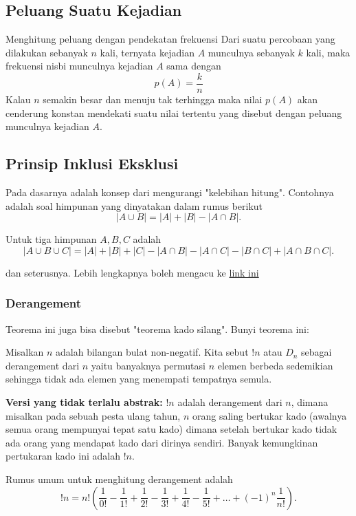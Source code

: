 \documentclass[11pt]{scrartcl}
\begin{document}
\subsection{Peluang Suatu Kejadian}
Menghitung peluang dengan pendekatan frekuensi 
Dari suatu percobaan yang dilakukan sebanyak $n$ kali, ternyata kejadian $A$ munculnya sebanyak 
$k$ kali, maka frekuensi nisbi munculnya kejadian $A$ sama dengan 
$$p(A)=\dfrac{k}{n}$$
Kalau $n$ semakin besar dan menuju tak terhingga maka nilai $p(A)$ akan cenderung konstan 
mendekati suatu nilai tertentu yang disebut dengan peluang munculnya kejadian $A$.

    \subsection{Prinsip Inklusi Eksklusi}
    Pada dasarnya adalah konsep dari mengurangi "kelebihan hitung". Contohnya adalah soal himpunan yang dinyatakan dalam rumus berikut
    $$|A \cup B|=|A|+|B|-|A \cap B|.$$
    
    Untuk tiga himpunan $A,B,C$ adalah
    $$|A \cup B \cup C|=|A|+|B|+|C|-|A \cap B|-|A \cap C|-|B \cap C|+|A \cap B \cap C|.$$
    
    dan seterusnya. Lebih lengkapnya boleh mengacu ke \href{https://brilliant.org/wiki/principle-of-inclusion-and-exclusion-pie/}{link ini}
    
    \subsubsection{Derangement}
    Teorema ini juga bisa disebut "teorema kado silang". Bunyi teorema ini:
    
    Misalkan $n$ adalah bilangan bulat non-negatif. Kita sebut $!n$ atau $D_n$ sebagai derangement dari $n$ yaitu banyaknya permutasi $n$ elemen berbeda sedemikian sehingga tidak ada elemen yang menempati tempatnya semula.
    
    \textbf{Versi yang tidak terlalu abstrak:} $!n$ adalah derangement dari $n$, dimana misalkan pada sebuah pesta ulang tahun, $n$ orang saling bertukar kado (awalnya semua orang mempunyai tepat satu kado) dimana setelah bertukar kado tidak ada orang yang mendapat kado dari dirinya sendiri. Banyak kemungkinan pertukaran kado ini adalah $!n$.
    
    Rumus umum untuk menghitung derangement adalah
    $$!n = n! \left(\dfrac{1}{0!}-\dfrac{1}{1!}+\dfrac{1}{2!}-\dfrac{1}{3!}+\dfrac{1}{4!}-\dfrac{1}{5!}+\dots+(-1)^n\dfrac{1}{n!}\right).$$
    
\end{document}
